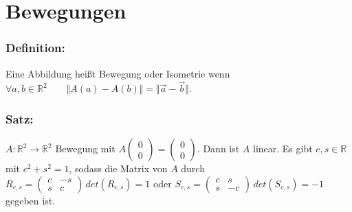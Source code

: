 \section{Bewegungen}
%
%
%
\subsubsection{Definition:}
Eine Abbildung heißt Bewegung oder Isometrie wenn $\forall a,b \in \mathbb{R}^{2}\qquad \Vert A(a) - A(b) \Vert = \Vert \vec{a}-\vec{b}\Vert$.
%
%
%
\subsubsection{Satz:}
$A: \mathbb{R}^{2} \rightarrow \mathbb{R}^{2}$ Bewegung mit $A\begin{pmatrix} 0 \\ 0 \end{pmatrix} = \begin{pmatrix} 0 \\ 0 \end{pmatrix}$. Dann ist $A$ linear. Es gibt $c,s \in \mathbb{R}$ mit $c^{2}+s^{2}=1$, sodass die Matrix von $A$ durch $R_{c,s} = \begin{pmatrix} c & -s \\ s & c \end{pmatrix} \, det(R_{c,s}) = 1$ oder $S_{c,s} = \begin{pmatrix} c & s \\ s & -c \end{pmatrix} \, det(S_{c,s}) = -1$ gegeben ist.
%
%
%
%
